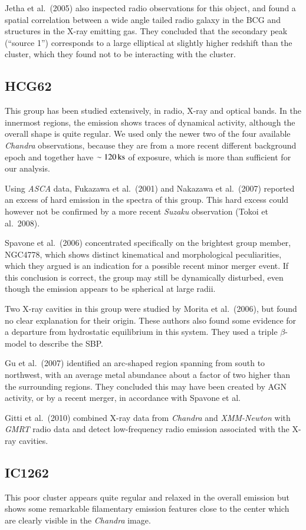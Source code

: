 \documentclass[structabstract]{aa}
\begin{document}
Jetha et al.\ (2005) also inspected radio observations for this object, and
found a spatial correlation between a wide angle tailed radio galaxy in the
BCG and structures in the X-ray emitting gas. They concluded
that the secondary peak (``source 1'') corresponds to a large elliptical at
slightly higher redshift than the cluster, which they found not to be
interacting with the cluster.
\subsection*{HCG62}
This group has been studied extensively, in radio, X-ray and optical bands. In
the innermost regions, the emission shows traces of dynamical activity,
although the overall shape is quite regular. We used only the newer two of the
four available \emph{Chandra} observations, because they are from a more
recent different background epoch and together have $\sim\unit[120]{ks}$ of
exposure, which is more than sufficient for our analysis.

Using \emph{ASCA} data, Fukazawa et al.\ (2001) and Nakazawa et
al.\ (2007) reported an excess of hard emission in the spectra of
this group. This hard excess could however not be confirmed by
a more recent \emph{Suzaku} observation (Tokoi et al.\ 2008).

Spavone et al.\ (2006) concentrated specifically on the brightest group
member, NGC4778, which shows distinct kinematical and morphological
peculiarities, which they argued is an indication for a possible recent minor
merger event. If this conclusion is correct, the group may still be dynamically
disturbed, even though the emission appears to be spherical at large radii.

Two X-ray cavities in this group were studied by Morita et al.\ (2006), but
found no clear explanation for their origin. These authors also found some
evidence for a departure from hydrostatic equilibrium in this system. They
used a triple $\beta$-model to describe the SBP.

Gu et al.\ (2007) identified an arc-shaped region spanning from south to northwest,
with an average metal abundance about a factor of two higher than the
surrounding regions. They concluded this may have been created by AGN activity,
or by a recent merger, in accordance with Spavone et al.

Gitti et al.\ (2010) combined X-ray data from \emph{Chandra} and
\emph{XMM-Newton} with \emph{GMRT} radio data and detect low-frequency radio
emission associated with the X-ray cavities.  
\subsection*{IC1262}
This poor cluster appears quite regular and relaxed in the overall emission
but shows some remarkable filamentary emission features close to the
center which are clearly visible in the \emph{Chandra} image.
\end{document}
